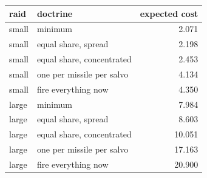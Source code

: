 \begin{tabular}{llr}
\toprule
raid & doctrine & expected cost \\
\midrule
small & minimum & 2.071 \\
small & equal share, spread & 2.198 \\
small & equal share, concentrated & 2.453 \\
small & one per missile per salvo & 4.134 \\
small & fire everything now & 4.350 \\
large & minimum & 7.984 \\
large & equal share, spread & 8.603 \\
large & equal share, concentrated & 10.051 \\
large & one per missile per salvo & 17.163 \\
large & fire everything now & 20.900 \\
\bottomrule
\end{tabular}
